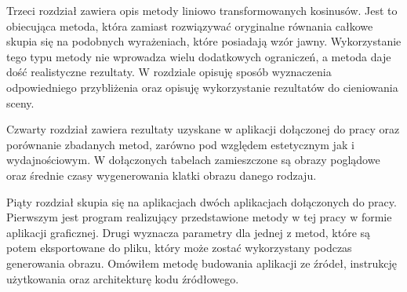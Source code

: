 \documentclass[../main.tex]{subfiles}
\begin{document}
Trzeci rozdział zawiera opis metody liniowo transformowanych kosinusów. Jest to obiecująca metoda, która zamiast rozwiązywać oryginalne równania całkowe skupia się na podobnych wyrażeniach, które posiadają wzór jawny. Wykorzystanie tego typu metody nie wprowadza wielu dodatkowych ograniczeń, a metoda daje dość realistyczne rezultaty. W rozdziale opisuję sposób wyznaczenia odpowiedniego przybliżenia oraz opisuję wykorzystanie rezultatów do cieniowania sceny.

Czwarty rozdział zawiera rezultaty uzyskane w aplikacji dołączonej do pracy oraz porównanie zbadanych metod, zarówno pod względem estetycznym jak i wydajnościowym. W dołączonych tabelach zamieszczone są obrazy poglądowe oraz średnie czasy wygenerowania klatki obrazu danego rodzaju.

Piąty rozdział skupia się na aplikacjach dwóch aplikacjach dołączonych do pracy. Pierwszym jest program realizujący przedstawione metody w tej pracy w formie aplikacji graficznej. Drugi wyznacza parametry dla jednej z metod, które są potem eksportowane do pliku, który może zostać wykorzystany podczas generowania obrazu. Omówiłem metodę budowania aplikacji ze źródeł, instrukcję użytkowania oraz architekturę kodu źródłowego.
\end{document}
